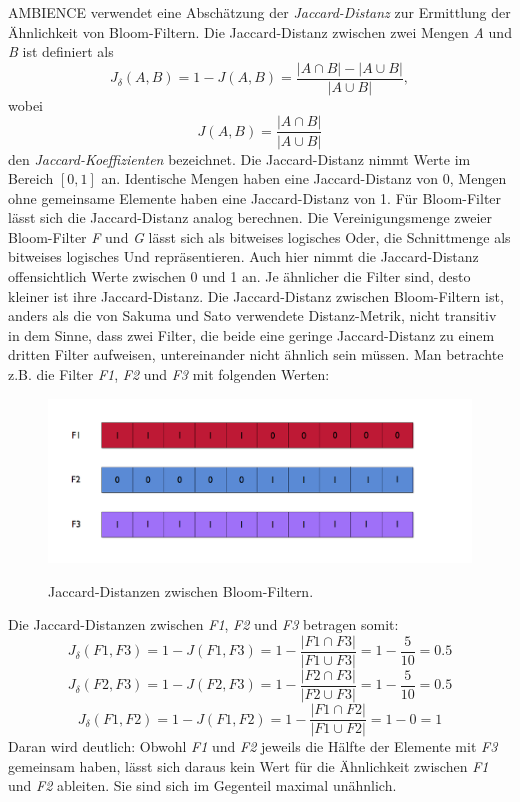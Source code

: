 AMBIENCE verwendet eine Abschätzung der \textit{Jaccard-Distanz} zur Ermittlung der Ähnlichkeit von Bloom-Filtern. Die Jaccard-Distanz zwischen zwei Mengen \textit{A} und \textit{B} ist definiert als 
\[J_{\delta}(A,B) = 1 - J(A,B) = \frac{|A\cap B| - |A\cup B|}{|A\cup B|}, \]
wobei 
\[J(A,B) = \frac{|A\cap B|}{|A\cup B|}\] den \textit{Jaccard-Koeffizienten} bezeichnet. Die Jaccard-Distanz nimmt Werte im Bereich $\left[0,1\right]$ an. Identische Mengen haben eine Jaccard-Distanz von 0, Mengen ohne gemeinsame Elemente haben eine Jaccard-Distanz von 1. 
Für Bloom-Filter lässt sich die Jaccard-Distanz analog berechnen. Die Vereinigungsmenge zweier Bloom-Filter \textit{F} und \textit{G} lässt sich als bitweises logisches Oder, die Schnittmenge als bitweises logisches Und repräsentieren. Auch hier nimmt die Jaccard-Distanz offensichtlich Werte zwischen 0 und 1 an. Je ähnlicher die Filter sind, desto kleiner ist ihre Jaccard-Distanz. 
Die Jaccard-Distanz zwischen Bloom-Filtern ist, anders als die von Sakuma und Sato verwendete Distanz-Metrik, nicht transitiv in dem Sinne, dass zwei Filter, die beide eine geringe Jaccard-Distanz zu einem dritten Filter aufweisen, untereinander nicht ähnlich sein müssen. Man betrachte z.B. die Filter \textit{F1}, \textit{F2} und \textit{F3} mit folgenden Werten: 
\begin{figure}
  \centering
  \includegraphics[width=1.0\textwidth]{pictures/filters.png}\\
  \caption[Jaccard-Distanzen zwischen Bloom-Filtern]{Jaccard-Distanzen zwischen Bloom-Filtern.}\label{fig:pic1}
\end{figure}
\noindent
Die Jaccard-Distanzen zwischen \textit{F1}, \textit{F2} und \textit{F3} betragen somit: 
\[J_{\delta}(F1,F3) = 1 - J(F1,F3) = 1 - \frac{|F1\cap F3|}{|F1\cup F3|} = 1 - \frac{5}{10} = 0.5\]
\[J_{\delta}(F2,F3) = 1 - J(F2,F3) = 1 - \frac{|F2\cap F3|}{|F2\cup F3|} = 1 - \frac{5}{10} = 0.5\]
\[J_{\delta}(F1,F2) = 1 - J(F1,F2) = 1 - \frac{|F1\cap F2|}{|F1\cup F2|} = 1 - 0 = 1\]
Daran wird deutlich: Obwohl \textit{F1} und \textit{F2} jeweils die Hälfte der Elemente mit \textit{F3} gemeinsam haben, lässt sich daraus kein Wert für die Ähnlichkeit zwischen \textit{F1} und \textit{F2} ableiten. Sie sind sich im Gegenteil maximal unähnlich. 
